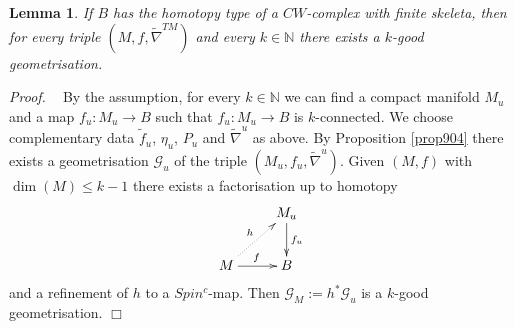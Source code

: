 \documentclass[12pt]{article}
\newtheorem{lem}[theorem]{Lemma}
\newcommand{\cG}{{\mathcal{G}}}
\def\hB{\hspace*{\fill}$\Box$ \newline\noindent}
\newcommand{\proof}{{\it Proof.$\:\:\:\:$}}
\newcommand{\nat}{{\mathbb{N}}}
\newcommand{\Td}{{\mathbf{Td}}}
\begin{document}
 




 





 \begin{lem}\label{lem1101}
If $B$ has the  homotopy type of a $CW$-complex with finite skeleta, then for every triple $(M,f,\tilde \nabla^{TM})$ and every $k\in \nat$ there exists a $k$-good geometrisation.
\end{lem}
\proof
By the assumption, for every $k\in \nat$ we can find a compact manifold $M_{u}$  and a  map
$f_{u}:M_{u}\to B$  such that
$f_{u}:M_{u}\to B$ is $k$-connected. 
We choose  complementary data $\tilde f_{u}$, $\eta_{u}$, $P_{u}$ and  $\tilde \nabla^{u}$  as above. %
By Proposition \ref{prop904} there exists a geometrisation $\cG_{u}$ of the triple
$(M_{u},f_{u},\tilde \nabla^{u})$. Given $(M,f)$ with  $\dim(M)\le k-1$ there exists a factorisation up to homotopy
\begin{equation}\label{eq734}\xymatrix{&M_{u}\ar[d]^{f_{u}}\\M\ar[r]^{f}\ar@{..>}[ur]^h&B}\end{equation}
and a refinement of $h$ to a $Spin^{c}$-map.
Then $\cG_{M}:=h^{*}\cG_{u}$ is a $k$-good geometrisation. \hB
 
\end{document}
